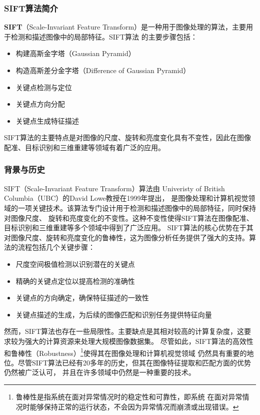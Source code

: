 \documentclass{nwputhesis}
\begin{document}
\subsubsection{SIFT算法简介}
\textbf{SIFT}（Scale-Invariant Feature Transform）是一种用于图像处理的算法，主要用于检测和描述图像中的局部特征。SIFT算法
的主要步骤包括：
\begin{itemize}
    \item 构建高斯金字塔（Gaussian Pyramid）
    \item 构造高斯差分金字塔（Difference of Gaussian Pyramid）
    \item 关键点检测与定位
    \item 关键点方向分配
    \item 关键点生成特征描述
\end{itemize}
\indent
SIFT算法的主要特点是对图像的尺度、旋转和亮度变化具有不变性，因此在图像配准、目标识别和三维重建等领域有着广泛的应用。

\subsubsection{背景与历史}
SIFT（Scale-Invariant Feature Transform）算法由 Univeristy of British Columbia（UBC）的David Lowe教授在1999年提出，
是图像处理和计算机视觉领域的一项关键技术。该算法专门设计用于检测和描述图像中的局部特征，同时保持对图像尺度、
旋转和亮度变化的不变性。这种不变性使得SIFT算法在图像配准、目标识别和三维重建等多个领域中得到了广泛应用。
SIFT算法的核心优势在于其对图像尺度、旋转和亮度变化的鲁棒性，这为图像分析任务提供了强大的支持。算法的流程包括几个关键步骤：
\begin{itemize}
    \item 尺度空间极值检测以识别潜在的关键点
    \item 精确的关键点定位以提高检测的准确性
    \item 关键点的方向确定，确保特征描述的一致性
    \item 关键点描述的生成，为后续的图像匹配和识别任务提供特征向量
\end{itemize}
\indent
然而，SIFT算法也存在一些局限性。主要缺点是其相对较高的计算复杂度，这要求较为强大的计算资源来处理大规模图像数据集。
尽管如此，SIFT算法的高效性和鲁棒性（Robustness）\footnote{鲁棒性是指系统在面对异常情况时的稳定性和可靠性，即系统
在面对异常情况时能够保持正常的运行状态，不会因为异常情况而崩溃或出现错误。}使得其在图像处理和计算机视觉领域
仍然具有重要的地位。尽管SIFT算法已经有20多年的历史，但其在图像特征提取和匹配方面的优势仍然被广泛认可，
并且在许多领域中仍然是一种重要的技术。
\end{document}
